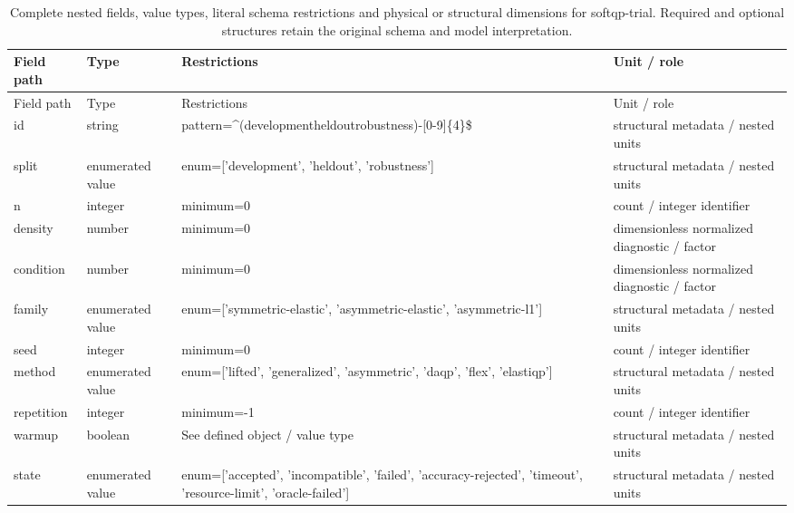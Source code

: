 \begingroup\footnotesize\setlength{\tabcolsep}{3pt}
\begin{longtable}{@{}>{\raggedright\arraybackslash}p{}>{\raggedright\arraybackslash}p{}>{\raggedright\arraybackslash}p{}>{\raggedright\arraybackslash}p{}@{}}
\caption{Complete nested fields, value types, literal schema restrictions and physical or structural dimensions for softqp-trial. Required and optional structures retain the original schema and model interpretation.}\label{tab:nested-softqp-trial}\\
\toprule Field path & Type & Restrictions & Unit / role\\\midrule\endfirsthead
\toprule Field path & Type & Restrictions & Unit / role\\\midrule\endhead
\bottomrule\endfoot
id & string & pattern=\allowbreak{}\textasciicircum{}(development\textbar{}\allowbreak{}heldout\textbar{}\allowbreak{}robustness)-[0-9]\{4\}\$ & structural metadata /\allowbreak{} nested units\\
split & enumerated value & enum=\allowbreak{}['development', 'heldout', 'robustness'] & structural metadata /\allowbreak{} nested units\\
n & integer & minimum=\allowbreak{}0 & count /\allowbreak{} integer identifier\\
density & number & minimum=\allowbreak{}0 & dimensionless normalized diagnostic /\allowbreak{} factor\\
condition & number & minimum=\allowbreak{}0 & dimensionless normalized diagnostic /\allowbreak{} factor\\
family & enumerated value & enum=\allowbreak{}['symmetric-\allowbreak{}elastic', 'asymmetric-\allowbreak{}elastic', 'asymmetric-\allowbreak{}l1'] & structural metadata /\allowbreak{} nested units\\
seed & integer & minimum=\allowbreak{}0 & count /\allowbreak{} integer identifier\\
method & enumerated value & enum=\allowbreak{}['lifted', 'generalized', 'asymmetric', 'daqp', 'flex', 'elastiqp'] & structural metadata /\allowbreak{} nested units\\
repetition & integer & minimum=\allowbreak{}-1 & count /\allowbreak{} integer identifier\\
warmup & boolean & See defined object /\allowbreak{} value type & structural metadata /\allowbreak{} nested units\\
state & enumerated value & enum=\allowbreak{}['accepted', 'incompatible', 'failed', 'accuracy-\allowbreak{}rejected', 'timeout', 'resource-\allowbreak{}limit', 'oracle-\allowbreak{}failed'] & structural metadata /\allowbreak{} nested units\\

\end{longtable}
